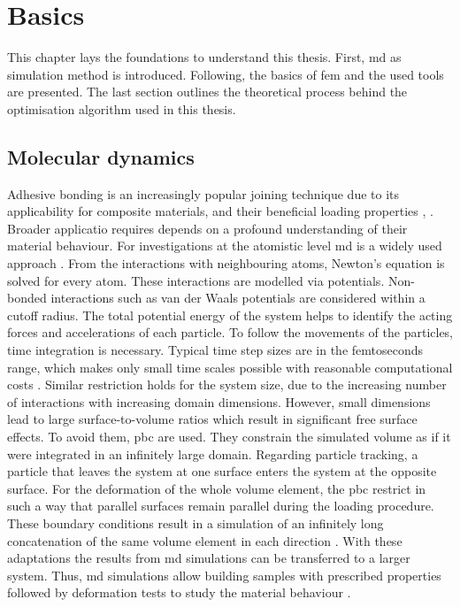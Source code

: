 




\chapter{Basics} \label{chap: basics}
This chapter lays the foundations to understand this thesis. First, \acrfull{md} as simulation method is introduced. Following, the basics of \acrshort{fem} and the used tools are presented. The last section outlines the theoretical process behind the optimisation algorithm used in this thesis.

\section{Molecular dynamics} \label{sec: MDBasics}
Adhesive bonding is an increasingly popular joining technique due to its applicability for composite materials, and their beneficial loading properties \cite{campilho_extended_2011}, \cite{pramanik_joining_2017}. Broader applicatio requires depends on a profound understanding of their material behaviour. For investigations at the atomistic level \acrfull{md} is a widely used approach  \cite{ries_mechanical_2024}. From the interactions with neighbouring atoms, Newton's equation is solved for every atom. These interactions are modelled via potentials. Non-bonded interactions such as van der Waals potentials are considered within a cutoff radius. The total potential energy of the system helps to identify the acting forces and accelerations of each particle. To follow the movements of the particles, time integration is necessary. Typical time step sizes are in the femtoseconds range, which makes only small time scales possible with reasonable computational costs \cite{ries_mechanical_2024}. Similar restriction holds for the system size, due to the increasing number of interactions with increasing domain dimensions. However, small dimensions lead to large surface-to-volume ratios which result in significant free surface effects. To avoid them, \acrfull{pbc} are used. They constrain the simulated volume as if it were integrated in an infinitely large domain. Regarding  particle tracking, a particle that leaves the system at one surface enters the system at the opposite surface. For the deformation of the whole volume element, the \acrshort{pbc} restrict in such a way that parallel surfaces remain parallel during the loading procedure. These boundary conditions result in a simulation of an infinitely long concatenation of the same volume element in each direction \cite{gorbunov_periodic_2022}.
With these adaptations the results from \acrshort{md} simulations can be transferred to a larger system. 
Thus, \acrshort{md} simulations allow building samples with prescribed properties followed by deformation tests to study the material behaviour \cite{buyukozturk_structural_2011}. 

